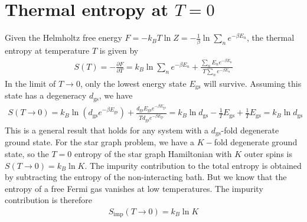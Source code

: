 \documentclass{revtex4-2}
\begin{document}
\section{Thermal entropy at \(T=0\)}
Given the Helmholtz free energy \(F = -k_B T \ln Z = - \frac{1}{\beta} \ln\sum_n e^{-\beta E_n}\), the thermal entropy at temperature \(T\) is given by
\begin{align}
	S(T) = - \frac{\partial{F}}{\partial{T}} = k_B \ln\sum_n e^{-\beta E_n} + \frac{\sum_n E_n e^{-\beta E_n}}{T \sum_n e^{-\beta E_n}}
\end{align}
In the limit of \(T \to 0\), only the lowest energy state \(E_\text{gs}\) will survive. Assuming this state has a degeneracy \(d_\text{gs}\), we have
\begin{align}
	S(T \to 0) = k_B \ln\left(d_\text{gs} e^{-\beta E_\text{gs}}\right) + \frac{d_\text{gs} E_\text{gs}e^{-\beta E_\text{gs}}}{T d_\text{gs} e^{-\beta E_\text{gs}}} = k_B \ln d_\text{gs} - \frac{1}{T}E_\text{gs} + \frac{1}{T}E_\text{gs} = k_B \ln d_\text{gs}
\end{align}
This is a general result that holds for any system with a \(d_\text{gs}\)-fold degenerate ground state. For the star graph problem, we have a \(K-\)fold degenerate ground state, so the \(T=0\) entropy of the star graph Hamiltonian with \(K\) outer spins is \(S(T\to 0) = k_B \ln K\). The impurity contribution to the total entropy is obtained by subtracting the entropy of the non-interacting bath. But we know that the entropy of a free Fermi gas vanishes at low temperatures. The impurity contribution is therefore
\begin{align}
	\label{res_entropy}
	S_\text{imp}(T\to 0) = k_B \ln K
\end{align}
\end{document}
